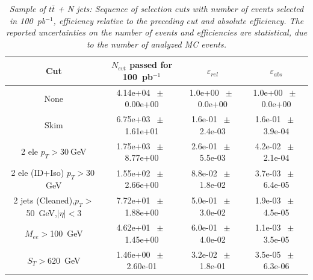 \begin{table}[htbp] 
\begin{center} 
\begin{tabular}{|c|c|c|c|} 
\hline\hline 
 Cut & $N_{evt}$ passed for 100~pb$^{-1}$ & $\varepsilon_{rel}$ & $\varepsilon_{abs}$ \\ 
\hline\hline 
None       &        4.14e+04       $~\pm~$       0.00e+00        &        1.0e+00       $~\pm~$       0.0e+00        &        1.0e+00       $~\pm~$       0.0e+00       \\       
       Skim       &        6.75e+03       $~\pm~$       1.61e+01        &        1.6e-01       $~\pm~$       2.4e-03        &        1.6e-01       $~\pm~$       3.9e-04       \\       
       2 ele $p_T>30~$GeV       &        1.75e+03       $~\pm~$       8.77e+00        &        2.6e-01       $~\pm~$       5.5e-03        &        4.2e-02       $~\pm~$       2.1e-04       \\       
       2 ele (ID+Iso) $p_T>30~$GeV       &        1.55e+02       $~\pm~$       2.66e+00        &        8.8e-02       $~\pm~$       1.8e-02        &        3.7e-03       $~\pm~$       6.4e-05       \\       
       2 jets (Cleaned),$p_T>$50~GeV,$|\eta|<$3       &        7.72e+01       $~\pm~$       1.88e+00        &        5.0e-01       $~\pm~$       3.0e-02        &        1.9e-03       $~\pm~$       4.5e-05       \\       
       $M_{ee}>$100~GeV       &        4.62e+01       $~\pm~$       1.45e+00        &        6.0e-01       $~\pm~$       4.0e-02        &        1.1e-03       $~\pm~$       3.5e-05       \\       
       $S_T>$620~GeV       &        1.46e+00       $~\pm~$       2.60e-01        &        3.2e-02       $~\pm~$       1.8e-01        &        3.5e-05       $~\pm~$       6.3e-06       \\       
          \hline\hline 
\end{tabular} 
\end{center} 
\caption{\small \sl Sample of $t\bar{t}$ + N jets: Sequence of selection cuts with number of events selected in 100~pb$^{-1}$, efficiency relative to the preceding cut and absolute efficiency.  The reported uncertainties on the number of events and efficiencies are statistical, due to the number of analyzed MC events.} 
\label{tab:effic-ttbar} 
\end{table} 

